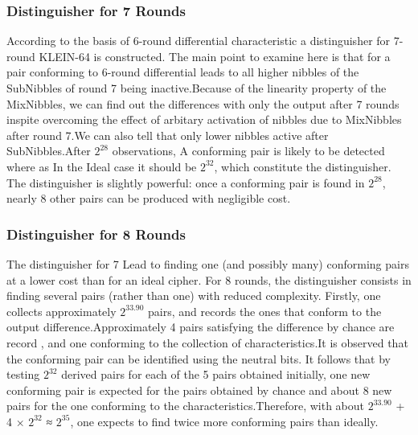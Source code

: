 \documentclass[preprint]{transcrypto}
\begin{document}
\subsubsection{Distinguisher for 7 Rounds}
According to the basis of 6-round differential characteristic a distinguisher for 7-round KLEIN-64 is constructed. The main point to examine here is that for a pair conforming to 6-round differential leads to all higher nibbles of the SubNibbles of round 7 being inactive.Because of the linearity property of the MixNibbles, we can find out the differences with only the output after 7 rounds inspite overcoming the effect of arbitary activation of nibbles due to MixNibbles after round 7.We can also tell that only lower nibbles active after SubNibbles.After $2^{28}$ observations, A conforming pair is likely to be detected where as In the Ideal case it should be $2^{32}$, which constitute the distinguisher. The distinguisher is slightly powerful: once a conforming pair is found in $2^{28}$, nearly 8 other pairs can be produced with negligible cost.\\


\subsubsection{Distinguisher for 8 Rounds}
The distinguisher for 7 Lead to finding one (and possibly many) conforming pairs at a lower cost than for an ideal cipher. For 8 rounds, the distinguisher consists in finding several pairs (rather than one) with reduced complexity. Firstly, one collects approximately $2^{33.90}$ pairs, and records the ones that conform to the output difference.Approximately 4 pairs satisfying the difference by chance are record , and one conforming to the collection of characteristics.It is observed that the conforming pair can be identified using the neutral bits. It follows that by testing $2^{32}$ derived pairs for each of the 5 pairs obtained initially, one new conforming pair is expected for the pairs obtained by chance and about 8 new pairs for the one conforming to the characteristics.Therefore, with about $2^{33.90}$ + 4 × $2^{32}$ ≈ $2^{35}$, one expects to find twice more conforming pairs than ideally.\\
\end{document}
